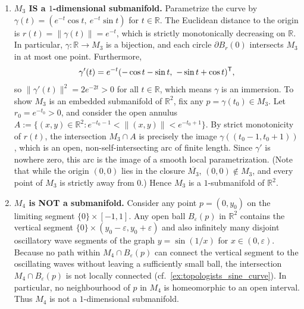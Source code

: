 \begin{exercisesolution}
\begin{enumerate}[label=\textbf{(\alph*)}]
  \item \textbf{$M_3$ IS a $1$-dimensional submanifold.}
    Parametrize the curve by $\gamma(t) = (e^{-t}\cos t,\ e^{-t}\sin t)$ for $t \in \mathbb{R}$.
    The Euclidean distance to the origin is $r(t) = \|\gamma(t)\| = e^{-t}$, which is strictly
    monotonically decreasing on $\mathbb{R}$. In particular, $\gamma : \mathbb{R} \to M_3$ is a bijection,
    and each circle $\partial B_r(0)$ intersects $M_3$ in at most one point.
    Furthermore,
    \[\gamma'(t) = e^{-t}(-\cos t - \sin t,\ -\sin t + \cos t)^{\mathsf{T}},\]
    so $\|\gamma'(t)\|^2 = 2e^{-2t} > 0$ for all $t \in \mathbb{R}$, which means $\gamma$ is an immersion.
    To show $M_3$ is an embedded submanifold of $\mathbb{R}^2$, fix any $p = \gamma(t_0) \in M_3$.
    Let $r_0 = e^{-t_0} > 0$, and consider the open annulus $A := \{(x,y) \in \mathbb{R}^2 : e^{-t_0-1} < \|(x,y)\| < e^{-t_0+1}\}$.
    By strict monotonicity of $r(t)$, the intersection $M_3 \cap A$ is precisely the image
    $\gamma((t_0-1, t_0+1))$, which is an open, non-self-intersecting arc of finite length.
    Since $\gamma'$ is nowhere zero, this arc is the image of a smooth local parametrization.
    (Note that while the origin $(0,0)$ lies in the closure $\overline{M_3}$, $(0,0) \notin M_3$,
    and every point of $M_3$ is strictly away from $0$.) Hence $M_3$ is a $1$-submanifold of $\mathbb{R}^2$.

  \item \textbf{$M_4$ is NOT a submanifold.}
    Consider any point $p = (0, y_0)$ on the limiting segment $\{0\} \times [-1, 1]$.
    Any open ball $B_\varepsilon(p)$ in $\mathbb{R}^2$ contains the vertical segment $\{0\} \times (y_0-\varepsilon, y_0+\varepsilon)$
    and also infinitely many disjoint oscillatory wave segments of the graph $y = \sin(1/x)$ for $x \in (0, \varepsilon)$.
    Because no path within $M_4 \cap B_\varepsilon(p)$ can connect the vertical segment to the oscillating
    waves without leaving a sufficiently small ball, the intersection $M_4 \cap B_\varepsilon(p)$ is not
    locally connected (cf.\ \cref{ex:topologists_sine_curve}). In particular, no neighbourhood of $p$ in
    $M_4$ is homeomorphic to an open interval. Thus $M_4$ is not a $1$-dimensional submanifold.
\end{enumerate}
\end{exercisesolution}


